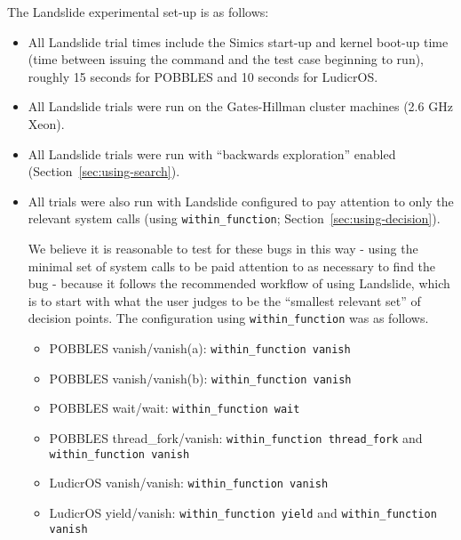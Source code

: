 
The Landslide experimental set-up is as follows:

\begin{itemize}
	\item All Landslide trial times include the Simics start-up and kernel boot-up time (time between issuing the command and the test case beginning to run), roughly 15 seconds for POBBLES and 10 seconds for LudicrOS.
	\item All Landslide trials were run on the Gates-Hillman cluster machines (2.6 GHz Xeon).
	\item All Landslide trials were run with ``backwards exploration'' enabled (Section~\ref{sec:using-search}).
	\item All trials were also run with Landslide configured to pay attention to only the relevant system calls (using \texttt{within\_function}; Section~\ref{sec:using-decision}).

	We believe it is reasonable to test for these bugs in this way - using the minimal set of system calls to be paid attention to as necessary to find the bug - because it follows the recommended workflow of using Landslide, which is to start with what the user judges to be the ``smallest relevant set'' of decision points. The configuration using \texttt{within\_function} was as follows.
	{\small
	\begin{itemize}
		\item POBBLES vanish/vanish(a): \texttt{within\_function vanish}
		\item POBBLES vanish/vanish(b): \texttt{within\_function vanish}
		\item POBBLES wait/wait: \texttt{within\_function wait}
		\item POBBLES thread\_fork/vanish: \texttt{within\_function thread\_fork} and \texttt{within\_function vanish}
		\item LudicrOS vanish/vanish: \texttt{within\_function vanish}
		\item LudicrOS yield/vanish: \texttt{within\_function yield} and \texttt{within\_function vanish}
	\end{itemize}
	}
\end{itemize}

%

